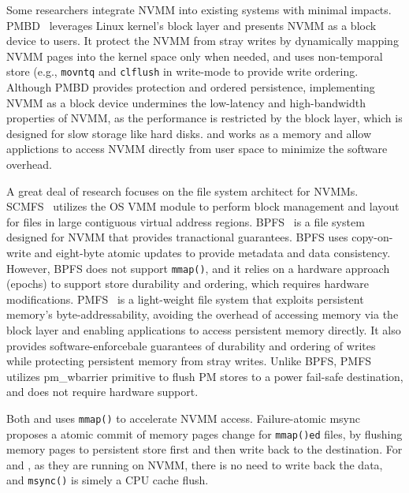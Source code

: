 Some researchers integrate NVMM into existing systems with minimal impacts.
PMBD~\cite{PMBD} leverages Linux kernel's block layer and presents NVMM as
a block device to users. It protect the NVMM from stray writes by dynamically
mapping NVMM pages into the kernel space only when needed, and uses non-temporal
store (e.g., \texttt{movntq} and \texttt{clflush} in write-mode to provide write
ordering.  Although PMBD provides protection and ordered persistence,
implementing NVMM as a block device undermines the low-latency and
high-bandwidth properties of NVMM, as the performance is restricted by the
block layer, which is designed for slow storage like hard disks. \DAChell{}
and \CChell{} works as a memory and allow applictions to access NVMM directly
from user space to minimize the software overhead.

A great deal of research focuses on the file system architect for NVMMs.
SCMFS~\cite{scmfs} utilizes the OS VMM module to perform  block
management and layout for files in large contiguous virtual address regions.
BPFS~\cite{BPFS} is a file system designed for NVMM that provides
tranactional guarantees. BPFS uses copy-on-write and eight-byte 
atomic updates to provide metadata and data consistency. However, BPFS does
not support \texttt{mmap()}, and it relies on a hardware approach (epochs)
to support store durability and ordering, which requires hardware
modifications.  PMFS~\cite{PMFS} is a light-weight
file system that exploits persistent memory's byte-addressability, avoiding the
overhead of accessing memory via the block layer and enabling applications to
access persistent memory directly.  It also provides software-enforcebale guarantees of durability
and ordering of writes while protecting persistent memory from stray writes.
Unlike BPFS, PMFS utilizes pm\_wbarrier primitive to flush PM stores to a power
fail-safe destination, and does not require hardware support.


Both \DAChell{} and \CChell uses \texttt{mmap()} to accelerate NVMM access.
Failure-atomic msync~\cite{atomicmsync} proposes a atomic commit of memory
pages change for \texttt{mmap()ed} files, by flushing memory pages to persistent
store first and then write back to the destination. For \DAChell{} and \CChell{}, as they are running on NVMM, there is no need to write back the data, and
\texttt{msync()} is simely a CPU cache flush.

\begin{comment}
We see two potential future improvements for \Chell{}. First, we hope to improve
it by adding
strong consistency and protection from malicious writes. Second, at present 
\Chell{} cannot avoid
\texttt{memcpy()} entirely, because POSIX APIs provide user buffers to fill with
data. If we modify the POSIX interfaces that return cache pages to applications
directly we can eliminate \texttt{memcpy}.
\end{comment}
